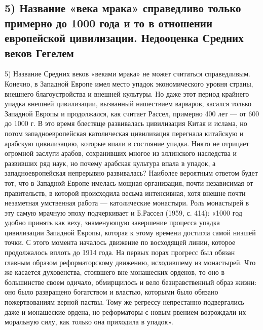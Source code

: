 \subsection{5) Название «века мрака» справедливо только примерно до
1000 года и то в отношении европейской цивилизации. Недооценка
Средних веков Гегелем}

5) Название Средних веков «веками мрака» не может считаться
справедливым. Конечно, в Западной Европе имел место упадок
экономического уровня страны, внешнего благоустройства и внешней
культуры. Но даже этот период крайнего упадка внешней цивилизации,
вызванный нашествием варваров, касался только Западной Европы и
продолжался, как считает Рассел, примерно 400 лет --- от 600 до 1000
г. В это время блестяще развивалась цивилизация Китая и ислама, но
потом западноевропейская католическая цивилизация перегнала китайскую
и арабскую цивилизацию, которые впали в состояние упадка. Никто не
отрицает огромной заслуги арабов, сохранивших многое из эллинского
наследства и развивших ряд наук, но почему арабская культура впала в
упадок, а западноевропейская непрерывно развивалась? Наиболее
вероятным ответом будет тот, что в Западной Европе имелась мощная
организация, почти независимая от правительств, в которой происходила
весьма интенсивная, хотя внешне почти незаметная умственная работа ---
католические монастыри. Роль монастырей в эту самую мрачную эпоху
подчеркивает и Б.Рассел (1959, с. 414): «1000 год удобно принять как
веху, знаменующую завершение процесса упадка цивилизации Западной
Европы, которая к этому времени достигла самой низшей точки. С этого
момента началось движение по восходящей линии, которое продолжалось
вплоть до 1914 года. На первых порах прогресс был обязан главным
образом реформаторскому движению, исходившему из монастырей. Что же
касается духовенства, стоявшего вне монашеских орденов, то оно в
большинстве своем одичало, обмирщилось и вело безнравственный образ
жизни: оно было развращено богатством и властью, которыми было обязано
пожертвованиям верной паствы. Тому же регрессу непрестанно
подвергались даже и монашеские ордена, но реформаторы с новым рвением
возрождали их моральную силу, как только она приходила в упадок».

